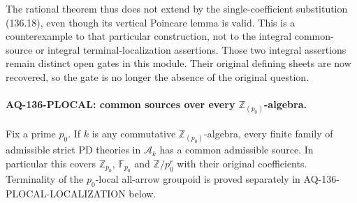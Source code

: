 \documentclass[11pt,a4paper]{article}
\theoremstyle{definition}\newtheorem{definition}[theorem]{Definition}
\theoremstyle{remark}\newtheorem{remark}[theorem]{Remark}
\begin{document}
The rational theorem thus does not extend by the
single-coefficient substitution (136.18), even
though its vertical Poincare lemma is valid.
This is a counterexample to that particular
construction, not to the integral common-source
or integral terminal-localization assertions.
Those two integral assertions remain distinct
open gates in this module.  Their original
defining sheets are now recovered, so the gate
is no longer the absence of the original question.


\paragraph{AQ-136-PLOCAL: common sources over every $\mathbb Z_{(p_0)}$-algebra.}
Fix a prime $p_0$.  If $k$ is any commutative
$\mathbb Z_{(p_0)}$-algebra, every finite family of admissible
strict PD theories in $\mathcal A_k$ has a common admissible
source.  In particular this covers $\mathbb Z_{p_0}$,
$\mathbb F_{p_0}$ and $\mathbb Z/p_0^r$ with their original
coefficients.  Terminality of the $p_0$-local all-arrow groupoid
is proved separately in AQ-136-PLOCAL-LOCALIZATION below.
\end{document}
